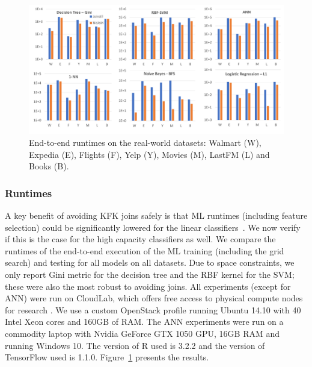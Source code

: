 \documentclass{vldb}
\begin{document}

\begin{figure}[t]
\centering
\includegraphics[width=\linewidth]{histogram.pdf}
\vspace{-4mm}
\caption{End-to-end runtimes on the real-world datasets: Walmart (W), Expedia (E), Flights (F), Yelp (Y), Movies (M), LastFM (L) and Books (B).}
\label{Figure:runtime}
\end{figure}

\subsubsection*{Runtimes}
A key benefit of avoiding KFK joins safely is that ML runtimes (including feature selection) could be significantly lowered for the linear classifiers~\cite{hamlet}.
We now verify if this is the case for the high capacity classifiers as well. We compare the runtimes of the end-to-end execution of the ML training (including the 
grid search) and testing for all models on all datasets.
Due to space constraints, we only report Gini metric for the decision tree and the RBF kernel for the SVM; these were also the most robust to avoiding joins.
All experiments (except for ANN) were run on CloudLab, which offers free access to physical compute nodes for research \cite{ricci2014introducing}. We use a custom OpenStack profile running Ubuntu 14.10 with 40 Intel Xeon cores and 160GB of RAM.
The ANN experiments were run on a commodity laptop with Nvidia GeForce GTX 1050 GPU, 16GB RAM and running Windows 10. The version of R used is 3.2.2 and the version of TensorFlow used is 1.1.0.
Figure~\ref{Figure:runtime} presents the results.
\end{document}
